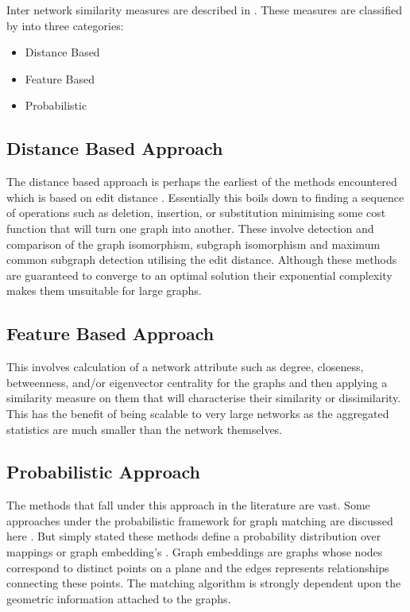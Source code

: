 Inter network similarity measures are described in \cite{Dehmer2006, Koutra2011,Soundarajan2014, Zager2008, Wang2008, Zass2008,Conet2004,Bunke2000}. These
measures are classified by \citeauthor{Ashby2007}\cite{Ashby2007} into three categories:
\begin{itemize}
    \item Distance Based
    \item Feature Based
    \item Probabilistic
\end{itemize}

\subsection{Distance Based Approach}

The distance based approach is perhaps the earliest of the methods encountered which is based on edit distance \citeauthor{Bunke2000}\cite{Bunke2000}. Essentially this boils down to finding a sequence of operations such as deletion, insertion, or substitution minimising some cost function that will turn one graph into another. These involve detection and comparison of the graph isomorphism, subgraph isomorphism and maximum common subgraph detection utilising the edit distance. Although these methods are guaranteed to converge to an optimal solution their exponential complexity makes them unsuitable for large graphs.

\subsection{Feature Based Approach}

This involves calculation of a network attribute such as degree, closeness,
betweenness, and/or eigenvector centrality for the graphs and then applying a similarity measure on them that will characterise their similarity or dissimilarity. This has the benefit of being scalable to very large networks as the aggregated statistics are much smaller than the network themselves.

\subsection{Probabilistic Approach}

The methods that fall under this approach in the literature are vast. Some approaches under the probabilistic framework for graph matching are discussed here \cite{Zass2008,Yaghi2008, Spielman2007, Caetano2009}. But simply stated these methods define a probability distribution over mappings or graph embedding’s \cite{Conet2004,Caetano2009}. Graph embeddings are graphs whose nodes correspond to distinct points on a plane and the edges represents relationships connecting these points. The matching algorithm is strongly dependent upon the geometric information attached to the
graphs\cite{Conet2004,Caetano2009}. \\

